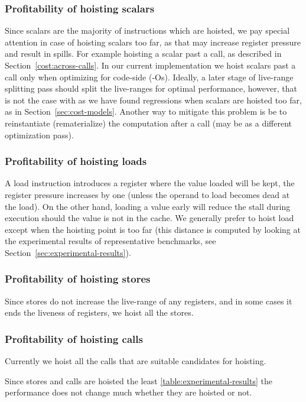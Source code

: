 \documentclass{sig-alternate}
\begin{document}
\subsubsection{Profitability of hoisting scalars}
Since scalars are the majority of instructions which are hoisted, we pay special
attention in case of hoisting scalars too far, as that may increase register
pressure and result in spills. For example hoisting a scalar past a call, as
described in Section~\ref{cost:across-calls}.  In our current implementation we
hoist scalars past a call only when optimizing for code-side (-Os). Ideally, a
later stage of live-range splitting pass should split the live-ranges for
optimal performance, however, that is not the case with \LLVM{} as we have found
regressions when scalars are hoisted too far, as in
Section~\ref{sec:cost-models}. Another way to mitigate this problem is be to
reinstantiate (rematerialize) the computation after a call (may be as a
different optimization pass).

\subsubsection{Profitability of hoisting loads}
A load instruction introduces a register where the value loaded will be kept,
the register pressure increases by one (unless the operand to load becomes dead
at the load). On the other hand, loading a value early will reduce the stall
during execution should the value is not in the cache. We generally prefer to
hoist load except when the hoisting point is too far (this distance is computed by
looking at the experimental results of representative benchmarks, see
Section~\ref{sec:experimental-results}).

\subsubsection{Profitability of hoisting stores}
Since stores do not increase the live-range of any registers, and in some cases
it ends the liveness of registers, we hoist all the stores.

\subsubsection{Profitability of hoisting calls}
Currently we hoist all the calls that are suitable candidates for hoisting.

Since stores and calls are hoisted the least \ref{table:experimental-results}
the performance does not change much whether they are hoisted or not.
\end{document}
